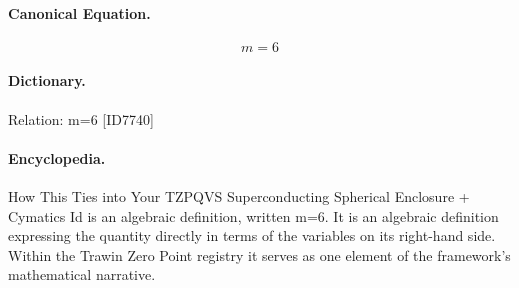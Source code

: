 \paragraph{Canonical Equation.}
\[
m=6
\]

\paragraph{Dictionary.}
Relation: m=6 [ID7740]

\paragraph{Encyclopedia.}
How This Ties into Your TZPQVS Superconducting Spherical Enclosure + Cymatics Id is an algebraic definition, written m=6. It is an algebraic definition expressing the quantity directly in terms of the variables on its right-hand side. Within the Trawin Zero Point registry it serves as one element of the framework's mathematical narrative.
